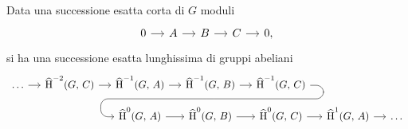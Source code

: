 \begin{theorem}\label{fond2}
	Data una successione esatta corta di $ G $ moduli
	\[\begin{tikzcd}[column sep = small]
	0 \rar & A \rar & B \rar & C \rar & 0,
	\end{tikzcd}\]
	si ha una successione esatta lunghissima di gruppi abeliani
	\[\begin{tikzcd}[column sep = small, row sep = small]
	\dots \rar & \Hh^{-2}(G, \, C) \rar &\Hh^{-1}(G, \, A) \rar & \Hh^{-1}(G, \, B) \arrow[d,phantom, ""{coordinate, name=W}] \rar & \Hh^{-1}(G, \, C) \arrow[dll, 
	rounded corners = 7 pt, 
	to path={ --([xshift=3ex]\tikztostart.east)
		|- (W)[near end]\tikztonodes
		-| ([xshift=-3ex]\tikztotarget.west)
		-- (\tikztotarget)}] && \\
	&&\Hh^0(G, \, A) \rar & \Hh^0(G, \, B) \rar & \Hh^0(G, \, C) \rar
	 & \Hh^1(G, \, A) \rar & \dots \end{tikzcd}\]
\end{theorem}

